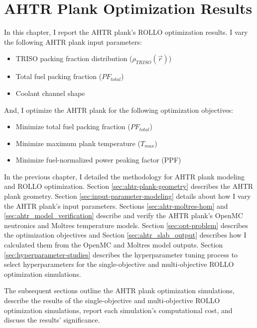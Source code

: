 \chapter{AHTR Plank Optimization Results}
\glsresetall
\label{chap:ahtr-plank-opt-results}
In this chapter, I report the \gls{AHTR} plank's \gls{ROLLO} optimization results. 
I vary the following \gls{AHTR} plank input parameters:
\begin{itemize}
    \item \gls{TRISO} packing fraction distribution ($\rho_{TRISO}(\vec{r})$)
    \item Total fuel packing fraction ($PF_{total}$)
    \item Coolant channel shape
\end{itemize} 
And, I optimize the \gls{AHTR} plank for the following optimization objectives:
\begin{itemize}
    \item Minimize total fuel packing fraction ($PF_{total}$)
    \item Minimize maximum plank temperature ($T_{max}$)
    \item Minimize fuel-normalized power peaking factor (PPF)
\end{itemize} 

In the previous chapter, I detailed the methodology for \gls{AHTR} plank modeling and 
\gls{ROLLO} optimization. 
Section \ref{sec:ahtr-plank-geometry} describes the \gls{AHTR} plank geometry.
Section \ref{sec:input-parameter-modeling} details about how I vary the 
\gls{AHTR} plank's input parameters. 
Sections \ref{sec:ahtr-moltres-hom} and \ref{sec:ahtr_model_verification}
describe and verify the \gls{AHTR} plank's OpenMC neutronics and Moltres 
temperature models. 
Section \ref{sec:opt-problem} describes the optimization objectives and Section 
\ref{sec:ahtr_slab_output} describes how I calculated them from the OpenMC and Moltres 
model outputs. 
Section \ref{sec:hyperparameter-studies} describes the hyperparameter tuning process 
to select hyperparameters for the single-objective and multi-objective \gls{ROLLO} 
optimization simulations.

The subsequent sections outline the \gls{AHTR} plank optimization simulations, describe 
the results of the single-objective and multi-objective \gls{ROLLO} optimization 
simulations, report each simulation's computational cost, and discuss the results' 
significance.

